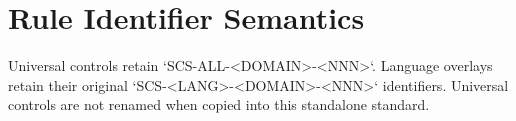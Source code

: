 \documentclass[10pt,letterpaper]{article}
\begin{document}
\section{Rule Identifier Semantics}
Universal controls retain `SCS-ALL-<DOMAIN>-<NNN>`. Language overlays retain their original `SCS-<LANG>-<DOMAIN>-<NNN>` identifiers. Universal controls are not renamed when copied into this standalone standard.
\end{document}
